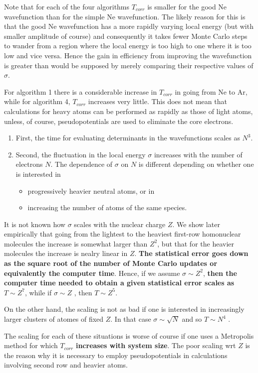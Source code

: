 \documentclass[twoside,english]{uiofysmaster}
\begin{document}
Note that for each of the four algorithms $T_{corr}$ is smaller for the good Ne wavefunction than for the simple Ne wavefunction. The likely reason for this is that the good Ne wavefunction has a more rapidly varying local energy (but with smaller amplitude of course) and consequently it takes fewer Monte Carlo steps to wander from a region where the local energy is too high to one where it is too low and vice versa. Hence the gain in efficiency from improving the wavefunction is greater than would be supposed by merely comparing their respective values of $\sigma$.

For algorithm 1 there is a considerable increase in $T_{corr}$ in going from Ne to Ar, while for algorithm 4, $T_{corr}$ increases very little. This does not mean that calculations for heavy atoms can be performed as rapidly as those of light atoms, unless, of course, pseudopotentials are used to eliminate the core electrons. 
\begin{enumerate}
	\item First, the time for evaluating determinants in the wavefunctions scales as $N^3$. 
	\item Second, the fluctuation in the local energy $\sigma$ increases with the number of electrons $N$. The dependence of $\sigma$ on $N$ is different depending on whether one is interested in 
	\begin{itemize}
		\item progressively heavier neutral atoms, or in 
		\item increasing the number of atoms of the same species. 
	\end{itemize}
\end{enumerate}
It is not known how $\sigma$ scales with the nuclear charge $Z$. We show later empirically that going from the lightest to the heaviest first-row homonuclear molecules the increase is somewhat larger than $Z^2$, but that for the heavier molecules the increase is nealry linear in $Z$. \textbf{The statistical error goes down as the square root of the number of Monte Carlo updates or equivalently the computer time}. Hence, if we assume $\sigma \sim Z^2$, \textbf{then the computer time needed to obtain a given statistical error scales as} $T \sim Z^7$, while if $\sigma \sim Z$ , then $T \sim Z^5$. 

On the other hand, the scaling is not as bad if one is interested in increasingly larger clusters of atomes of fixed $Z$. In that case $\sigma \sim \sqrt{N}$ and so $T \sim N^4$ . 

The scaling for each of these situations is worse of course if one uses a Metropolis method for which $T_{corr}$ \textbf{increases with system size}. The poor scaling wrt $Z$ is the reason why it is necessary to employ pseudopotentials in calculations involving second row and heavier atoms.
\end{document}
